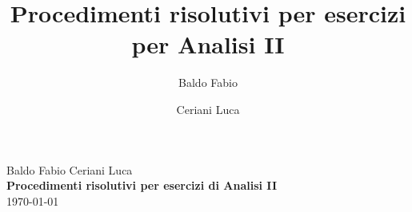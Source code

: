 \documentclass[10pt,a4paper]{report}
\author{Baldo Fabio \and Ceriani Luca\\[12pt]}
\title{\textbf{Procedimenti risolutivi per esercizi per Analisi II}}
\newcommand{\erre}[1]{$\mathbb{R}^{#1}$}
\begin{document}
\begin{center}
	{
	\vspace*{1cm}
	\large
	Baldo Fabio \hspace{2cm} Ceriani Luca\\[1cm]
	\LARGE
	\textbf{Procedimenti risolutivi per esercizi di Analisi II}\\[1cm]
	\large\today\\[2cm]
	}
\end{center}

%    
%                
%            
%    
%	
\end{document}
